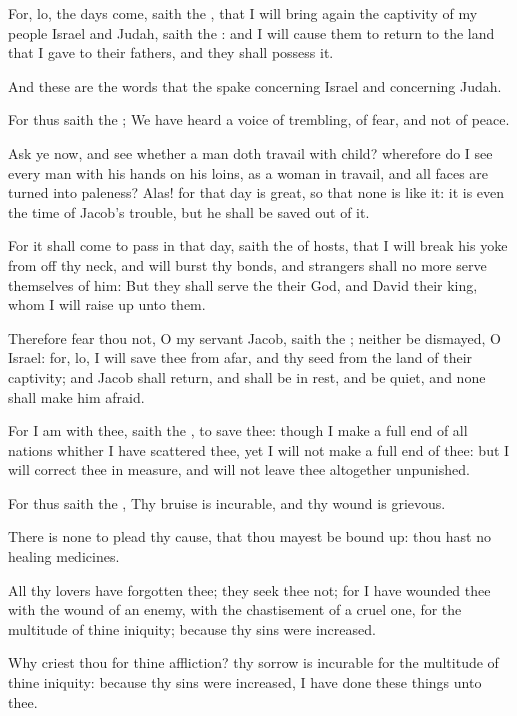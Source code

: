 \Verse For, lo, the days come, saith the \LORD, that I will bring again the captivity of my people Israel and Judah, saith the \LORD: and I will cause them to return to the land that I gave to their fathers, and they shall possess it.

\Verse And these are the words that the \LORD spake concerning Israel and concerning Judah.

\Verse For thus saith the \LORD; We have heard a voice of trembling, of fear, and not of peace.

\Verse Ask ye now, and see whether a man doth travail with child?  wherefore do I see every man with his hands on his loins, as a woman in travail, and all faces are turned into paleness?  \Verse Alas! for that day is great, so that none is like it: it is even the time of Jacob's trouble, but he shall be saved out of it.

\Verse For it shall come to pass in that day, saith the \LORD of hosts, that I will break his yoke from off thy neck, and will burst thy bonds, and strangers shall no more serve themselves of him: \Verse But they shall serve the \LORD their God, and David their king, whom I will raise up unto them.

\Verse Therefore fear thou not, O my servant Jacob, saith the \LORD; neither be dismayed, O Israel: for, lo, I will save thee from afar, and thy seed from the land of their captivity; and Jacob shall return, and shall be in rest, and be quiet, and none shall make him afraid.

\Verse For I am with thee, saith the \LORD, to save thee: though I make a full end of all nations whither I have scattered thee, yet I will not make a full end of thee: but I will correct thee in measure, and will not leave thee altogether unpunished.

\Verse For thus saith the \LORD, Thy bruise is incurable, and thy wound is grievous.

\Verse There is none to plead thy cause, that thou mayest be bound up: thou hast no healing medicines.

\Verse All thy lovers have forgotten thee; they seek thee not; for I have wounded thee with the wound of an enemy, with the chastisement of a cruel one, for the multitude of thine iniquity; because thy sins were increased.

\Verse Why criest thou for thine affliction? thy sorrow is incurable for the multitude of thine iniquity: because thy sins were increased, I have done these things unto thee.

